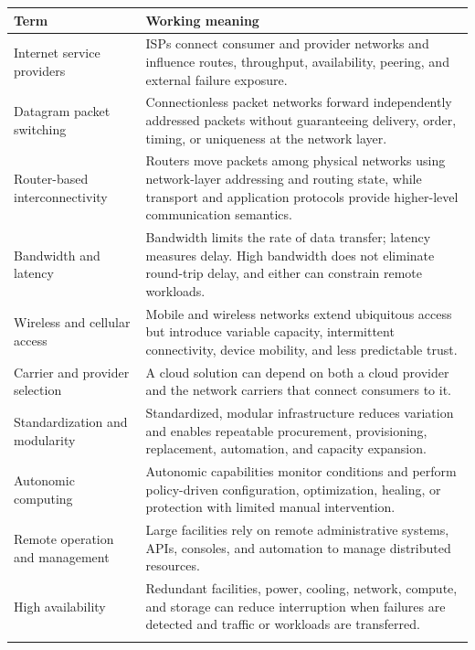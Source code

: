 \documentclass[11pt]{article}
\begin{document}
\begin{longtable}{@{}>{\RaggedRight\arraybackslash}p{}>{\RaggedRight\arraybackslash}p{}@{}}
\toprule\rowcolor{Navy}\color{white}\textbf{Term} & \color{white}\textbf{Working meaning}\\\midrule\endhead
Internet service providers & ISPs connect consumer and provider networks and influence routes, throughput, availability, peering, and external failure exposure. \\\addlinespace[2pt]
Datagram packet switching & Connectionless packet networks forward independently addressed packets without guaranteeing delivery, order, timing, or uniqueness at the network layer. \\\addlinespace[2pt]
Router-based interconnectivity & Routers move packets among physical networks using network-layer addressing and routing state, while transport and application protocols provide higher-level communication semantics. \\\addlinespace[2pt]
Bandwidth and latency & Bandwidth limits the rate of data transfer; latency measures delay. High bandwidth does not eliminate round-trip delay, and either can constrain remote workloads. \\\addlinespace[2pt]
Wireless and cellular access & Mobile and wireless networks extend ubiquitous access but introduce variable capacity, intermittent connectivity, device mobility, and less predictable trust. \\\addlinespace[2pt]
Carrier and provider selection & A cloud solution can depend on both a cloud provider and the network carriers that connect consumers to it. \\\addlinespace[2pt]
Standardization and modularity & Standardized, modular infrastructure reduces variation and enables repeatable procurement, provisioning, replacement, automation, and capacity expansion. \\\addlinespace[2pt]
Autonomic computing & Autonomic capabilities monitor conditions and perform policy-driven configuration, optimization, healing, or protection with limited manual intervention. \\\addlinespace[2pt]
Remote operation and management & Large facilities rely on remote administrative systems, APIs, consoles, and automation to manage distributed resources. \\\addlinespace[2pt]
High availability & Redundant facilities, power, cooling, network, compute, and storage can reduce interruption when failures are detected and traffic or workloads are transferred. \\\addlinespace[2pt]

\end{longtable}
\end{document}
